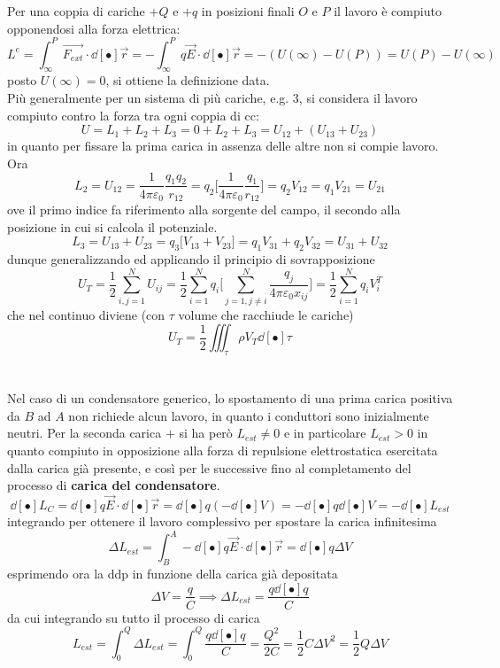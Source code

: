Per una coppia di cariche $+Q$ e $+q$ in posizioni finali $O$ e $P$ il lavoro è compiuto opponendosi alla forza elettrica:
\[L^e = \int_\infty^P \vec{F_{ext}} \cdot \dd[•]{\vec{r}} = - \int_\infty^P q\vec{E} \cdot \dd[•]{\vec{r}} = - (U(\infty) - U(P)) = U(P) - U(\infty)\]
posto $U(\infty) = 0$, si ottiene la definizione data.
\\Più generalmente per un sistema di più cariche, e.g. 3, si considera il lavoro compiuto contro la forza tra ogni coppia di cc:
\[U = L_1 + L_2 + L_3 = 0 + L_2 + L_3 = U_{12} + (U_{13} + U_{23})\]
in quanto per fissare la prima carica in assenza delle altre non si compie lavoro. Ora
\[L_2 = U_{12} = \frac{1}{4 \pi \varepsilon_0} \frac{q_1 q_2}{r_{12}} = q_2 \bigg[\frac{1}{4 \pi \varepsilon_0} \frac{q_1}{r_{12}}\bigg] = q_2 V_{12} = q_1 V_{21} = U_{21}\]
ove il primo indice fa riferimento alla sorgente del campo, il secondo alla posizione in cui si calcola il potenziale.
\[L_3 = U_{13} + U_{23} = q_3 \big[V_{13} + V_{23}\big] = q_1 V_{31} + q_2 V_{32} = U_{31} + U_{32}\]
dunque generalizzando ed applicando il principio di sovrapposizione
\[U_T = \frac{1}{2} \sum\limits_{i,j=1}^{N} U_{ij} = \frac{1}{2} \sum\limits_{i=1}^{N} q_i \bigg[\sum\limits_{j=1, j \neq i}^{N} \frac{q_j}{4 \pi \varepsilon_0 x_{ij}}\bigg] = \frac{1}{2} \sum\limits_{i=1}^{N} q_i V_{i}^{T}\]
che nel continuo diviene (con $\tau$ volume che racchiude le cariche)
\[U_T = \frac{1}{2} \iiint_\tau \rho V_T \dd[•]{\tau}\]
\\~\\
Nel caso di un condensatore generico, lo spostamento di una prima carica positiva da $B$ ad $A$ non richiede alcun lavoro, in quanto i conduttori sono inizialmente neutri. Per la seconda carica $+$ si ha però $L_{est} \neq 0$ e in particolare $L_{est} > 0$ in quanto compiuto in opposizione alla forza di repulsione elettrostatica esercitata dalla carica già presente, e così per le successive fino al completamento del processo di \textbf{carica del condensatore}.
\[\dd[•]{L_C} = \dd[•]{q} \vec{E} \cdot \dd[•]{\vec{r}} = \dd[•]{q} (- \dd[•]{V}) = - \dd[•]{q} \dd[•]{V} = - \dd[•]{L_{est}}\]
integrando per ottenere il lavoro complessivo per spostare la carica infinitesima
\[\Delta L_{est} = \int_B^A - \dd[•]{q} \vec{E} \cdot \dd[•]{\vec{r}} = \dd[•]{q} \Delta V\]
esprimendo ora la ddp in funzione della carica già depositata
\[\Delta V = \frac{q}{C} \implies \Delta L_{est} = \frac{q \dd[•]{q}}{C}\]
da cui integrando su tutto il processo di carica
\[L_{est} = \int_0^Q \Delta L_{est} = \int_0^Q \frac{q \dd[•]{q}}{C} = \frac{Q^2}{2C} = \frac{1}{2} C \Delta V^2 = \frac{1}{2} Q \Delta V\]

